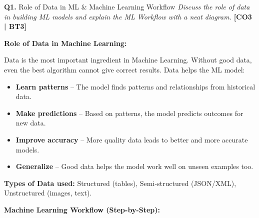 \documentclass[12pt,a4paper]{article}
\newcommand{\Qno}[1]{\textbf{\color{darkred}Q#1.}}
\newcommand{\term}[1]{\textbf{\color{headingcolor}#1}}
\begin{document}
\begin{questionbox}{\Qno{1} Role of Data in ML \& Machine Learning Workflow}
\textit{Discuss the role of data in building ML models and explain the ML Workflow with a neat diagram.} \hfill \textbf{[CO3 | BT3]}
\end{questionbox}

\begin{answerenv}

\textbf{\color{headingcolor}Role of Data in Machine Learning:}

Data is the most important ingredient in Machine Learning. Without good data, even the best algorithm cannot give correct results. Data helps the ML model:
\begin{itemize}[leftmargin=1.5em, itemsep=2pt]
  \item \term{Learn patterns} -- The model finds patterns and relationships from historical data.
  \item \term{Make predictions} -- Based on patterns, the model predicts outcomes for new data.
  \item \term{Improve accuracy} -- More quality data leads to better and more accurate models.
  \item \term{Generalize} -- Good data helps the model work well on unseen examples too.
\end{itemize}

\textbf{\color{headingcolor}Types of Data used:} Structured (tables), Semi-structured (JSON/XML), Unstructured (images, text).

\vspace{6pt}
\textbf{\color{headingcolor}Machine Learning Workflow (Step-by-Step):}

\begin{center}
\end{center}
\end{answerenv}
\end{document}
